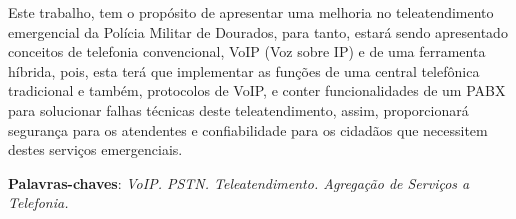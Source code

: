 \setlength{\absparsep}{18pt} %
\begin{resumo}

Este trabalho, tem o propósito de apresentar uma melhoria no teleatendimento emergencial da Polícia Militar de Dourados, para tanto, estará sendo apresentado conceitos de telefonia convencional, VoIP (Voz sobre IP) e de uma ferramenta híbrida, pois, esta terá que implementar as funções de uma central telefônica tradicional e também, protocolos de VoIP, e conter funcionalidades de um PABX para solucionar falhas técnicas deste teleatendimento, assim, proporcionará segurança para os atendentes e confiabilidade para os cidadãos que necessitem destes serviços emergenciais.

 \textbf{Palavras-chaves}: \textit{VoIP. PSTN. Teleatendimento. Agregação de Serviços a Telefonia.}
\end{resumo}
